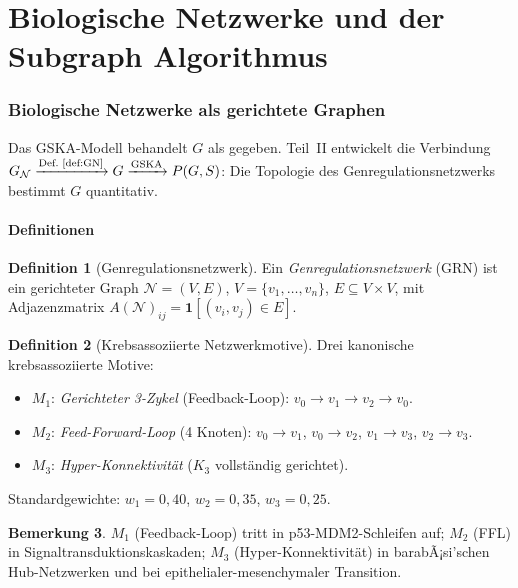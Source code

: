 ﻿\documentclass[12pt, a4paper]{article}
\theoremstyle{definition}
\newtheorem{definition}{Definition}[section]
\newtheorem{bemerkung}[definition]{Bemerkung}
\theoremstyle{remark}
\newcommand{\calN}{\mathcal{N}}
\newcommand{\GN}{G_{\calN}}
\begin{document}


\part{Biologische Netzwerke und der Subgraph Algorithmus}
\label{part:bio}


\section{Biologische Netzwerke als gerichtete Graphen}
\label{sec:netzwerke}


Das GSKA-Modell behandelt $G$ als gegeben. Teil~II entwickelt die Verbindung
$\GN \xrightarrow{\text{Def.~\ref{def:GN}}} G \xrightarrow{\text{GSKA}} P(G,S)$:
Die Topologie des Genregulationsnetzwerks bestimmt $G$ quantitativ.

\subsection{Definitionen}

\begin{definition}[Genregulationsnetzwerk]
\label{def:grn}
Ein \emph{Genregulationsnetzwerk} (GRN) ist ein gerichteter Graph
$\calN = (V, E)$, $V = \{v_1, \ldots, v_n\}$, $E \subseteq V \times V$,
mit Adjazenzmatrix $A(\calN)_{ij} = \mathbf{1}[(v_i,v_j)\in E]$.
\end{definition}

\begin{definition}[Krebsassoziierte Netzwerkmotive]
\label{def:motiv}
Drei kanonische krebsassoziierte Motive:
\begin{itemize}
  \item $M_1$: \emph{Gerichteter 3-Zykel} (Feedback-Loop):
    $v_0\to v_1\to v_2\to v_0$.
  \item $M_2$: \emph{Feed-Forward-Loop} (4 Knoten):
    $v_0\to v_1$, $v_0\to v_2$, $v_1\to v_3$, $v_2\to v_3$.
  \item $M_3$: \emph{Hyper-Konnektivität} ($K_3$ vollständig gerichtet).
\end{itemize}
Standardgewichte: $w_1 = 0{,}40$, $w_2 = 0{,}35$, $w_3 = 0{,}25$.
\end{definition}

\begin{bemerkung}
$M_1$ (Feedback-Loop) tritt in p53-MDM2-Schleifen auf; $M_2$ (FFL)
in Signaltransduktionskaskaden; $M_3$ (Hyper-Konnektivität) in barabÃ¡si'schen
Hub-Netzwerken und bei epithelialer-mesenchymaler Transition.
\end{bemerkung}
\end{document}
